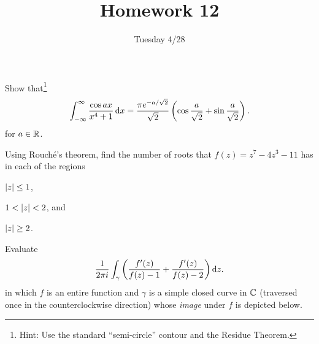 \documentclass {../math135}
\title {Homework 12}
\author {}
\date {Tuesday 4/28}
\begin{document}
\begin{exercise}
	Show that\footnote{Hint: Use the standard ``semi-circle'' contour
    and the Residue Theorem.}
  \[
		\int_{-\infty}^\infty \frac {\cos a x} {x^4+1} \mathop{}\!\mathrm d x
    = \frac {\pi e^{- a / \sqrt 2}} {\sqrt 2}
    \left ( \cos \frac a {\sqrt 2} + \sin \frac a {\sqrt 2} \right ).
  \]
	for \(a \in \mathbb R\).

  \begin {solution}

  \end {solution}

\end{exercise}

\begin{exercise}
	Using Rouch\'e's theorem, find the number of roots that
  \(f(z) = z^7 - 4z^3 - 11\) has in each of the regions
  \begin {problems}
  \item \(\lvert z\rvert \le 1\),

    \begin {solution}

    \end {solution}

  \item \(1 < \lvert z\rvert < 2\), and

    \begin {solution}

    \end {solution}

  \item \(\lvert z\rvert \ge 2\).

    \begin {solution}

    \end {solution}

  \end {problems}
\end{exercise}

\begin{exercise}
	Evaluate
  \[
    \frac 1 {2 \pi i} \int_\gamma \left (
      \frac {f'(z)} {f(z)-1} + \frac {f'(z)} {f(z)-2}
    \right ) \mathop{}\!\mathrm d z.
  \]
	in which \(f\) is an entire function and \(\gamma\) is a simple
  closed curve in \(\mathbb C\) (traversed once in the counterclockwise
  direction) whose \emph{image} under \(f\) is depicted below.
  \begin {center}
  \end {center}

  \begin {solution}

  \end {solution}

\end{exercise}
\end{document}
